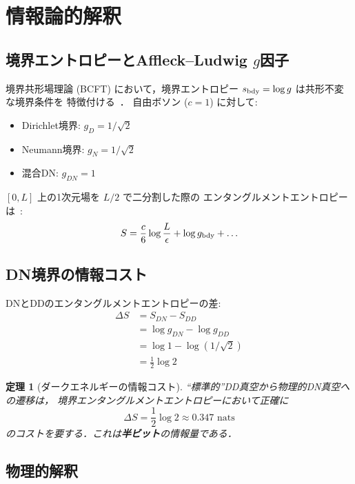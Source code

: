 \documentclass[11pt,a4paper]{article}
\newtheorem{theorem}{定理}
\begin{document}
\section{情報論的解釈}

\subsection{境界エントロピーとAffleck--Ludwig $g$因子}

境界共形場理論 (BCFT) において，境界エントロピー
$s_{\rm bdy} = \log g$ は共形不変な境界条件を
特徴付ける~\cite{AffleckLudwig1991}．
自由ボソン ($c = 1$) に対して:

\begin{itemize}
\item Dirichlet境界: $g_D = 1/\sqrt{2}$
\item Neumann境界: $g_N = 1/\sqrt{2}$
\item 混合DN: $g_{DN} = 1$
\end{itemize}

$[0, L]$ 上の1次元場を $L/2$ で二分割した際の
エンタングルメントエントロピーは~\cite{CalabreseCardy2004}:
\begin{equation}
S = \frac{c}{6}\log\frac{L}{\epsilon} + \log g_{\rm bdy} + \ldots
\end{equation}

\subsection{DN境界の情報コスト}

DNとDDのエンタングルメントエントロピーの差:
\begin{align}
\Delta S &= S_{DN} - S_{DD} \\
&= \log g_{DN} - \log g_{DD} \\
&= \log 1 - \log(1/\sqrt{2}) \\
&= \frac{1}{2}\log 2
\end{align}

\begin{theorem}[ダークエネルギーの情報コスト]
\label{th:info-cost}
``標準的''DD真空から物理的DN真空への遷移は，
境界エンタングルメントエントロピーにおいて正確に
\begin{equation}
\boxed{\Delta S = \frac{1}{2}\log 2 \approx 0.347 \text{ nats}}
\end{equation}
のコストを要する．これは\textbf{半ビット}の情報量である．
\end{theorem}

\subsection{物理的解釈}
\end{document}
